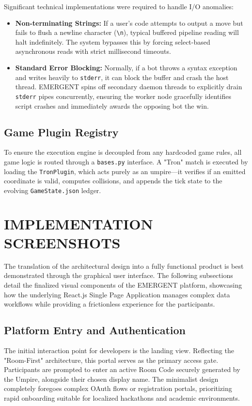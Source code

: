 \documentclass[12pt,a4paper]{report}
\begin{document}
Significant technical implementations were required to handle I/O anomalies:
\begin{itemize}
    \item \textbf{Non-terminating Strings:} If a user's code attempts to output a move but fails to flush a newline character (\texttt{\textbackslash n}), typical buffered pipeline reading will halt indefinitely. The system bypasses this by forcing select-based asynchronous reads with strict millisecond timeouts.
    \item \textbf{Standard Error Blocking:} Normally, if a bot throws a syntax exception and writes heavily to \texttt{stderr}, it can block the buffer and crash the host thread. EMERGENT spins off secondary daemon threads to explicitly drain \texttt{stderr} pipes concurrently, ensuring the worker node gracefully identifies script crashes and immediately awards the opposing bot the win.
\end{itemize}

\subsection{Game Plugin Registry}
To ensure the execution engine is decoupled from any hardcoded game rules, all game logic is routed through a \texttt{bases.py} interface. A "Tron" match is executed by loading the \texttt{TronPlugin}, which acts purely as an umpire—it verifies if an emitted coordinate is valid, computes collisions, and appends the tick state to the evolving \texttt{GameState.json} ledger.

\section{IMPLEMENTATION SCREENSHOTS}

The translation of the architectural design into a fully functional product is best demonstrated through the graphical user interface. The following subsections detail the finalized visual components of the EMERGENT platform, showcasing how the underlying React.js Single Page Application manages complex data workflows while providing a frictionless experience for the participants.

\subsection{Platform Entry and Authentication}
The initial interaction point for developers is the landing view. Reflecting the "Room-First" architecture, this portal serves as the primary access gate. Participants are prompted to enter an active Room Code securely generated by the Umpire, alongside their chosen display name. The minimalist design completely foregoes complex OAuth flows or registration portals, prioritizing rapid onboarding suitable for localized hackathons and academic environments.
\end{document}
